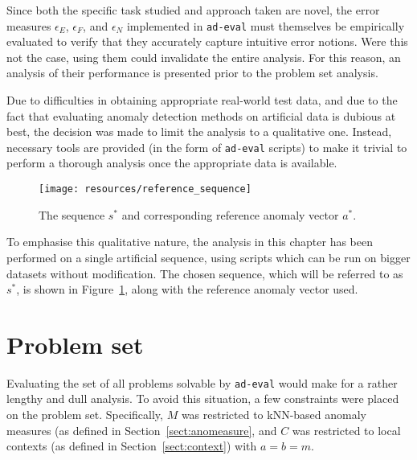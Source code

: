 Since both the specific task studied and approach taken are novel, the error measures $\epsilon_E$, $\epsilon_F$, and $\epsilon_N$ implemented in \texttt{ad-eval} must themselves be empirically evaluated to verify that they accurately capture intuitive error notions. Were this not the case, using them could invalidate the entire analysis. For this reason, an analysis of their performance is presented prior to the problem set analysis.

Due to difficulties in obtaining appropriate real-world test data, and due to the fact that evaluating anomaly detection methods on artificial data is dubious at best, the decision was made to limit the analysis to a qualitative one. Instead, necessary tools are provided (in the form of \texttt{ad-eval} scripts) to make it trivial to perform a thorough analysis once the appropriate data is available.

\begin{figure}[h]
    \begin{center}
        \texttt{[image: resources/reference\_sequence]}
    \end{center}
    \caption{\small{The sequence $s^*$ and corresponding reference anomaly vector $a^*$.}}
\label{fig:reference_sequence}
\end{figure}

To emphasise this qualitative nature, the analysis in this chapter has been performed on a single artificial sequence, using scripts which can be run on bigger datasets without modification. The chosen sequence, which will be referred to as $s^*$, is shown in Figure~\ref{fig:reference_sequence}, along with the reference anomaly vector used.

\section{Problem set}
Evaluating the set of all problems solvable by \texttt{ad-eval} would make for a rather lengthy and dull analysis. To avoid this situation, a few constraints were placed on the problem set. Specifically, $M$ was restricted to kNN-based anomaly measures (as defined in Section~\ref{sect:anomeasure}, and $C$ was restricted to local contexts (as defined in Section~\ref{sect:context}) with $a = b = m$.

